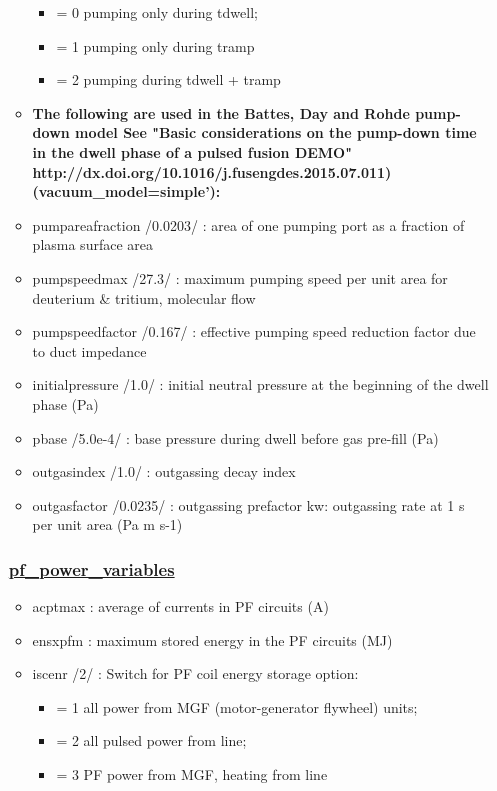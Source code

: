 \documentclass[
]{article}
\providecommand{\tightlist}{%
  \setlength{\itemsep}{0pt}\setlength{\parskip}{0pt}}
\begin{document}
\begin{itemize}
\begin{itemize}
    \begin{itemize}
    \tightlist
    \item
      = 0 pumping only during tdwell;
    \item
      = 1 pumping only during tramp
    \item
      = 2 pumping during tdwell + tramp
    \end{itemize}
  \item
    \textbf{The following are used in the Battes, Day and Rohde
    pump-down model See "Basic considerations on the pump-down time in
    the dwell phase of a pulsed fusion DEMO"
    http://dx.doi.org/10.1016/j.fusengdes.2015.07.011)
    (vacuum\_model=simple'):}
  \item
    pumpareafraction /0.0203/ : area of one pumping port as a fraction
    of plasma surface area
  \item
    pumpspeedmax /27.3/ : maximum pumping speed per unit area for
    deuterium \& tritium, molecular flow
  \item
    pumpspeedfactor /0.167/ : effective pumping speed reduction factor
    due to duct impedance
  \item
    initialpressure /1.0/ : initial neutral pressure at the beginning of
    the dwell phase (Pa)
  \item
    pbase /5.0e-4/ : base pressure during dwell before gas pre-fill (Pa)
  \item
    outgasindex /1.0/ : outgassing decay index
  \item
    outgasfactor /0.0235/ : outgassing prefactor kw: outgassing rate at
    1 s per unit area (Pa m s-1)
  \end{itemize}

  \hypertarget{pf_power_variables}{%
  \subsubsection{\texorpdfstring{\href{pf_power_variables.html}{pf\_power\_variables}}{pf\_power\_variables}}\label{pf_power_variables}}

  \begin{itemize}
  \tightlist
  \item
    acptmax : average of currents in PF circuits (A)
  \item
    ensxpfm : maximum stored energy in the PF circuits (MJ)
  \item
    iscenr /2/ : Switch for PF coil energy storage option:

    \begin{itemize}
    \tightlist
    \item
      = 1 all power from MGF (motor-generator flywheel) units;
    \item
      = 2 all pulsed power from line;
    \item
      = 3 PF power from MGF, heating from line
    \end{itemize}


\end{itemize}
\end{itemize}
\end{document}
